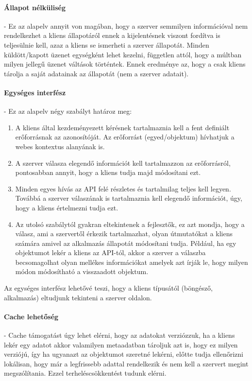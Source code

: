\paragraph{Állapot nélküliség} - Ez az alapelv annyit von magában, hogy a szerver semmilyen információval nem rendelkezhet a kliens állapotáról ennek a kijelentésnek viszont fordítva is teljesülnie kell, azaz a kliens se ismerheti a szerver állapotát. Minden küldött/kapott üzenet egységként lehet kezelni, független attól, hogy a múltban milyen jellegű üzenet váltások történtek. Ennek eredménye az, hogy a csak kliens tárolja a saját adatainak az állapotát (nem a szerver adatait).
\paragraph{Egységes interfész} - Ez az alapelv négy szabályt határoz meg:
\begin{enumerate}
		\item A kliens által kezdeményezett kérésnek tartalmaznia kell a fent definiált erőforrásnak az azonosítóját. Az erőforrást (egyed/objektum) hívhatjuk a webes kontextus alanyának is.
		\item A szerver válasza elegendő információt kell tartalmazzon az erőforrásról, pontosabban annyit, hogy a kliens tudja majd módosítani ezt.
		\item Minden egyes hívás az API felé részletes és tartalmilag teljes kell legyen. Továbbá a szerver válaszának is tartalmaznia kell elegendő információt, úgy, hogy a kliens értelmezni tudja ezt.
		\item Az utolsó szabálytól gyakran eltekintenek a fejlesztők, ez azt mondja, hogy a válasz, ami a szervertől érkezik tartalmazhat, olyan útmutatókat a kliens számára amivel az alkalmazás állapotát módosítani tudja. Például, ha egy objektumot lekér a kliens az API-tól, akkor a szerver a válaszba becsomagolhat olyan mellékes információkat amelyek azt írják le, hogy milyen módon módosítható a visszaadott objektum.
\end{enumerate}
Az egységes interfész lehetővé teszi, hogy a kliens típusától (böngésző, alkalmazás) eltudjunk tekinteni a szerver oldalon.
\paragraph{Cache lehetőség} - Cache támogatást úgy lehet elérni, hogy az adatokat verziózzuk, ha a kliens lekér egy adatot akkor valamilyen metaadatban tároljuk azt is, hogy ez milyen verziójú, így ha ugyanazt az objektumot szeretné lekérni, előtte tudja ellenőrizni lokálisan, hogy már a legfrissebb adattal rendelkezik és nem kell a szervert megint megszólítania. Ezzel terheléscsökkentést tudunk elérni.
